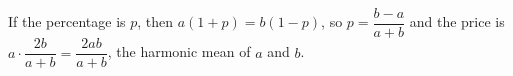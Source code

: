 If the percentage is $p$, then $a(1+p)=b(1-p)$, so $p=\dfrac{b-a}{a+b}$ and the price is $a\cdot\dfrac{2b}{a+b}=\boxed{\dfrac{2ab}{a+b}}$, the harmonic mean of $a$ and $b$.

